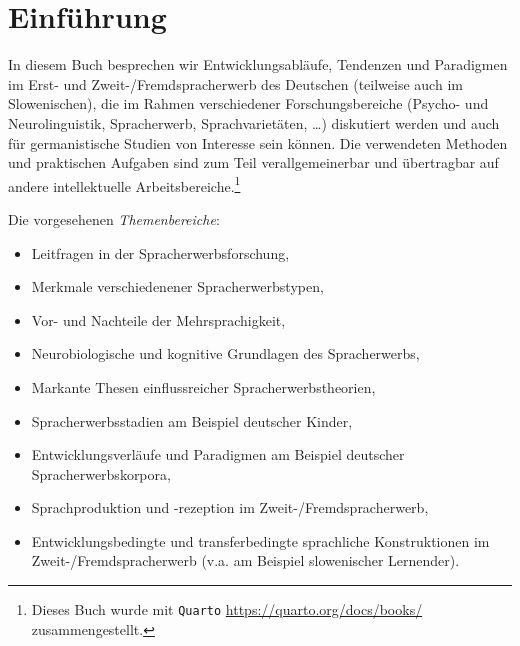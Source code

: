 \documentclass[
  letterpaper,
]{scrbook}
\providecommand{\tightlist}{%
  \setlength{\itemsep}{0pt}\setlength{\parskip}{0pt}}\usepackage{longtable,booktabs,array}
\begin{document}
\hypertarget{sec-einfuhrung}{%
\chapter{Einführung}\label{sec-einfuhrung}}

In diesem Buch besprechen wir Entwicklungsabläufe, Tendenzen und
Paradigmen im Erst- und Zweit-/Fremdspracherwerb des Deutschen
(teilweise auch im Slowenischen), die im Rahmen verschiedener
Forschungsbereiche (Psycho- und Neurolinguistik, Spracherwerb,
Sprachvarietäten, \ldots) diskutiert werden und auch für germanistische
Studien von Interesse sein können. Die verwendeten Methoden und
praktischen Aufgaben sind zum Teil verallgemeinerbar und übertragbar auf
andere intellektuelle Arbeitsbereiche.\footnote{Dieses Buch wurde mit
  \texttt{Quarto} \url{https://quarto.org/docs/books/} zusammengestellt.}

Die vorgesehenen \emph{Themenbereiche}:\\

\begin{itemize}
\tightlist
\item
  Leitfragen in der Spracherwerbsforschung,\\
\item
  Merkmale verschiedenener Spracherwerbstypen,\\
\item
  Vor- und Nachteile der Mehrsprachigkeit,\\
\item
  Neurobiologische und kognitive Grundlagen des Spracherwerbs,\\
\item
  Markante Thesen einflussreicher Spracherwerbstheorien,\\
\item
  Spracherwerbsstadien am Beispiel deutscher Kinder,\\
\item
  Entwicklungsverläufe und Paradigmen am Beispiel deutscher
  Spracherwerbskorpora,\\
\item
  Sprachproduktion und -rezeption im Zweit-/Fremdspracherwerb,\\
\item
  Entwicklungsbedingte und transferbedingte sprachliche Konstruktionen
  im Zweit-/Fremdspracherwerb (v.a. am Beispiel slowenischer
  Lernender).\\
\end{itemize}
\end{document}
